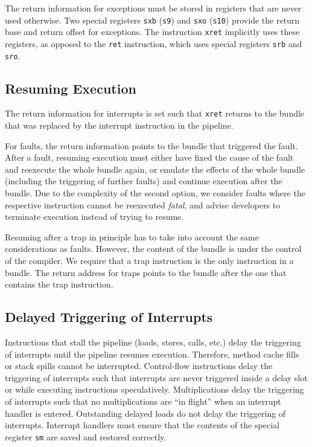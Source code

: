 \documentclass[a4paper,fontsize=10pt,twoside,DIV15,BCOR12mm,headinclude=true,footinclude=false,pagesize,bibtotoc]{scrbook}
\begin{document}
The return information for exceptions must be stored in registers that
are never used otherwise. Two special registers \texttt{sxb}
(\texttt{s9}) and \texttt{sxo} (\texttt{s10}) provide the return base
and return offset for exceptions. The instruction \texttt{xret}
implicitly uses these registers, as opposed to the \texttt{ret}
instruction, which uses special registers \texttt{srb} and
\texttt{sro}.

\subsection{Resuming Execution}

The return information for interrupts is set such that \texttt{xret}
returns to the bundle that was replaced by the interrupt
instruction in the pipeline.

For faults, the return information points to the bundle that triggered
the fault. After a fault, resuming execution must either have fixed
the cause of the fault and reexecute the whole bundle again, or
emulate the effects of the whole bundle (including the triggering of
further faults) and continue execution after the bundle. Due to the
complexity of the second option, we consider faults where the
respective instruction cannot be reexecuted \emph{fatal}, and advise
developers to terminate execution instead of trying to resume.

Resuming after a trap in principle has to take into account the same
considerations as faults. However, the content of the bundle is under
the control of the compiler. We require that a trap instruction is the
only instruction in a bundle. The return address for traps points to
the bundle after the one that contains the trap instruction.

\subsection{Delayed Triggering of Interrupts}

Instructions that stall the pipeline (loads, stores, calls, etc.)
delay the triggering of interrupts until the pipeline resumes
execution. Therefore, method cache fills or stack spills cannot be
interrupted. Control-flow instructions delay the triggering of
interrupts such that interrupts are never triggered inside a delay
slot or while executing instructions speculatively. Multiplications
delay the triggering of interrupts such that no multiplications are
``in flight'' when an interrupt handler is entered. Outstanding
delayed loads do not delay the triggering of interrupts. Interrupt
handlers must ensure that the contents of the special register
\texttt{sm} are saved and restored correctly.
\end{document}
